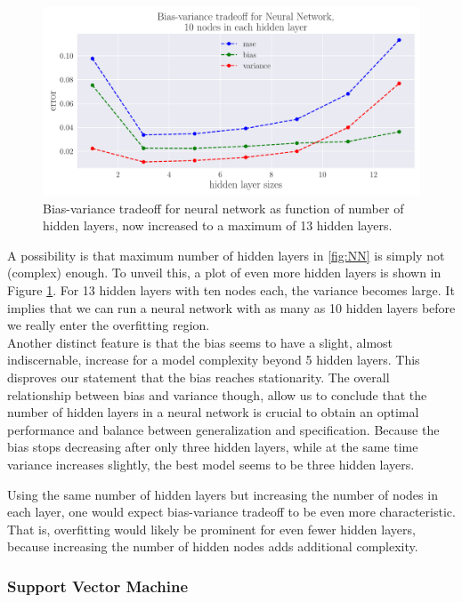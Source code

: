 \documentclass[a4paper]{article}
\begin{document}
	\begin{figure}[h]
		\centering
		\includegraphics[scale=0.5]{../output_extra/plots/bias_var_NN_layers7_nodes10.pdf}
		\caption{Bias-variance tradeoff for neural network as function of number of hidden layers, now increased to a maximum of 13 hidden layers.}
		\label{fig:NN_complex}
	\end{figure}
	
	A possibility is that maximum number of hidden layers in \ref{fig:NN} is simply not (complex) enough. To unveil this, a plot of even more hidden layers is shown in Figure \ref{fig:NN_complex}. For 13 hidden layers with ten nodes each, the variance becomes large. It implies that we can run a neural network with as many as 10 hidden layers before we really enter the overfitting region. \\
	
	Another distinct feature is that the bias seems to have a slight, almost indiscernable, increase for a model complexity beyond 5 hidden layers. This disproves our statement that the bias reaches stationarity. The overall relationship between bias and variance though, allow us to conclude that the number of hidden layers in a neural network is crucial to obtain an optimal performance and balance between generalization and specification. Because the bias stops decreasing after only three hidden layers, while at the same time variance increases slightly, the best model seems to be three hidden layers.
	
	Using the same number of hidden layers but increasing the number of nodes in each layer, one would expect bias-variance tradeoff to be even more characteristic. That is, overfitting would likely be prominent for even fewer hidden layers, because increasing the number of hidden nodes adds additional complexity. 
	
	
	\subsubsection*{Support Vector Machine}
	
\end{document}
